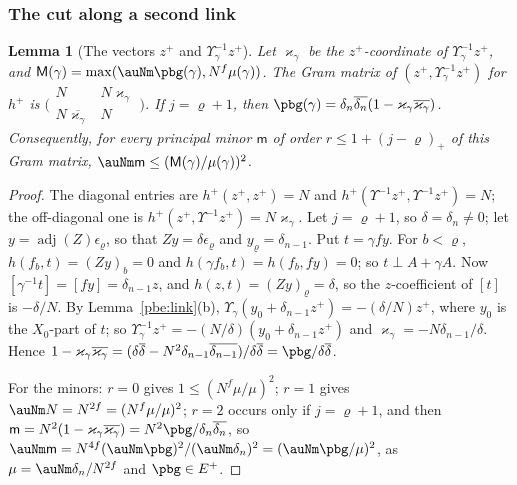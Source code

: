 \documentclass[10pt]{amsart}
\newtheorem{lemma}[theorem]{Lemma}
\theoremstyle{definition}
\theoremstyle{remark}
\newcommand{\N}{\mathbb N}
\providecommand{\aubar}[1]{\overline{#1}}
\begin{document}
\subsubsection{The cut along a second link}\label{pbg:ss-cut}

\begin{lemma}[The vectors $z^+$ and $\Upsilon_\gamma^{-1}z^+$]\label{pbg:linkvec}
Let $\varkappa_\gamma$ be the $z^+$-coordinate of $\Upsilon_\gamma^{-1}z^+$, and $\mathsf M(\gamma)=\max(
\auNm\pbg(\gamma),N^f\mu(\gamma))$. The Gram matrix of $(z^+,\Upsilon_\gamma^{-1}z^+)$ for $h^+$ is
$\bigl(\begin{smallmatrix}N&N\varkappa_\gamma\\N\aubar{\varkappa_\gamma}&N\end{smallmatrix}\bigr)$. If $j=\varrho+1$,
then $\pbg(\gamma)=\delta_n\aubar{\delta_n}(1-\varkappa_\gamma\aubar{\varkappa_\gamma})$. Consequently, for every
principal minor $\mathsf m$ of order $r\le1+(j-\varrho)_+$ of this Gram matrix, $\auNm\mathsf m\le(\mathsf
M(\gamma)/\mu(\gamma))^2$.
\end{lemma}
\begin{proof}
The diagonal entries are $h^+(z^+,z^+)=N$ and $h^+(\Upsilon^{-1}z^+,\Upsilon^{-1}z^+)=N$; the
off-diagonal one is $h^+(z^+,\Upsilon^{-1}z^+)=N\varkappa_\gamma$. Let $j=\varrho+1$, so $\delta=\delta_n\ne0$;
let $y=\operatorname{adj}(Z)\epsilon_\varrho$, so that $Zy=\delta\epsilon_\varrho$ and $y_\varrho=
\delta_{n-1}$. Put $t=\gamma fy$. For $b<\varrho$, $h(f_b,t)=(Zy)_b=0$ and $h(\gamma f_b,t)=h(f_b,fy)=0$; so
$t\perp A+\gamma A$. Now $[\gamma^{-1}t]=[fy]=\delta_{n-1}z$, and $h(z,t)=(Zy)_\varrho=\delta$, so the
$z$-coefficient of $[t]$ is $-\delta/N$. By Lemma~\ref{pbe:link}(b), $\Upsilon_\gamma(y_0+\delta_{n-1}z^+)=
-(\delta/N)z^+$, where $y_0$ is the $X_0$-part of $t$; so $\Upsilon_\gamma^{-1}z^+=-(N/\delta)(y_0+
\delta_{n-1}z^+)$ and $\varkappa_\gamma=-N\delta_{n-1}/\delta$. Hence $1-\varkappa_\gamma\aubar{\varkappa_\gamma}=(\delta
\aubar\delta-N^2\delta_{n-1}\aubar{\delta_{n-1}})/\delta\aubar\delta=\pbg/\delta\aubar\delta$.

For the minors: $r=0$ gives $1\le(N^f\mu/\mu)^2$; $r=1$ gives $\auNm N=N^{2f}=(N^f\mu/\mu)^2$; $r=2$
occurs only if $j=\varrho+1$, and then $\mathsf m=N^2(1-\varkappa_\gamma\aubar{\varkappa_\gamma})=N^2\pbg/\delta_n
\aubar{\delta_n}$, so $\auNm\mathsf m=N^{4f}(\auNm\pbg)^2/(\auNm\delta_n)^2=(\auNm\pbg/\mu)^2$, as $\mu=
\auNm\delta_n/N^{2f}$ and $\pbg\in E^+$.
\end{proof}
\end{document}
